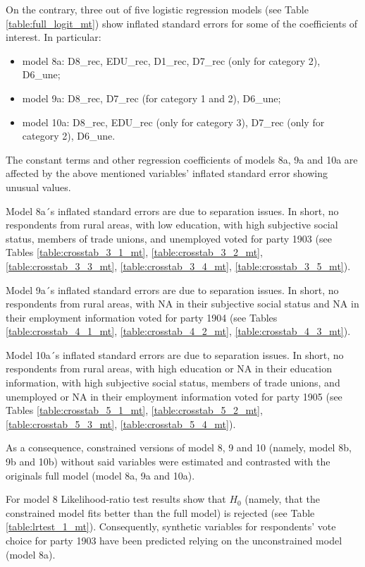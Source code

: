 \documentclass[
]{article}
\providecommand{\tightlist}{%
  \setlength{\itemsep}{0pt}\setlength{\parskip}{0pt}}
\begin{document}
On the contrary, three out of five logistic regression models (see Table \ref{table:full_logit_mt}) show
inflated standard errors for some of the coefficients of interest. In particular:

\begin{itemize}
\tightlist
\item
  model 8a: D8\_rec, EDU\_rec, D1\_rec, D7\_rec (only for category 2), D6\_une;
\item
  model 9a: D8\_rec, D7\_rec (for category 1 and 2), D6\_une;
\item
  model 10a: D8\_rec, EDU\_rec (only for category 3), D7\_rec (only for category 2), D6\_une.
\end{itemize}

The constant terms and other regression coefficients of models 8a, 9a and 10a are affected by the above mentioned variables' inflated standard error showing unusual values.

Model 8a´s inflated standard errors are due to separation issues. In short, no respondents from rural areas, with low education, with high subjective social status, members of trade unions, and unemployed voted for party 1903 (see Tables \ref{table:crosstab_3_1_mt}, \ref{table:crosstab_3_2_mt}, \ref{table:crosstab_3_3_mt}, \ref{table:crosstab_3_4_mt}, \ref{table:crosstab_3_5_mt}).

Model 9a´s inflated standard errors are due to separation issues. In short, no respondents from rural areas, with NA in their subjective social status and NA in their employment information voted for party 1904 (see Tables \ref{table:crosstab_4_1_mt}, \ref{table:crosstab_4_2_mt}, \ref{table:crosstab_4_3_mt}).

Model 10a´s inflated standard errors are due to separation issues. In short, no respondents from rural areas, with high education or NA in their education information, with high subjective social status, members of trade unions, and unemployed or NA in their employment information voted for party 1905 (see Tables \ref{table:crosstab_5_1_mt}, \ref{table:crosstab_5_2_mt}, \ref{table:crosstab_5_3_mt}, \ref{table:crosstab_5_4_mt}).

As a consequence, constrained versions of model 8, 9 and 10 (namely, model 8b, 9b and 10b) without said variables were estimated and contrasted with the originals full model (model 8a, 9a and 10a).

For model 8 Likelihood-ratio test results show that \(H_0\) (namely, that the constrained model fits better than the full model) is rejected (see Table \ref{table:lrtest_1_mt}). Consequently, synthetic variables for respondents' vote choice for party 1903 have been predicted relying on the unconstrained model (model 8a).
\end{document}

